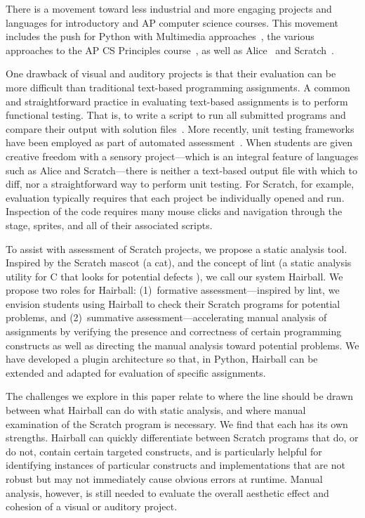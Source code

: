 There is a movement toward less industrial and more engaging projects and
languages for introductory and AP computer science courses.  This movement
includes the push for Python with Multimedia
approaches~\cite{Adams:2012:SLP:2157136.2157319, Forte:2004:CCC:962752.962945,
Simon:2010:ERC:1822090.1822151}, the various approaches to the AP CS Principles
course~\cite{Snyder:2012:FFC:2189835.2189852}, as well as
Alice~\cite{Cooper:2003:TOI:611892.611966} and
Scratch~\cite{Maloney:2010:SPL:1868358.1868363}.

One drawback of visual and auditory projects is that their evaluation can be
more difficult than traditional text-based programming assignments.  A common
and straightforward practice in evaluating text-based assignments is to perform
functional testing. That is, to write a script to run all submitted programs
and compare their output with solution
files~\cite{Jackson:1997:GSP:268084.268210}.  More recently, unit testing
frameworks have been employed as part of automated
assessment~\cite{Spacco:2006:EMD:1140124.1140131,
  Edwards:2003:RCS:949344.949390}.  When students are given creative freedom
with a sensory project---which is an integral feature of languages such as
Alice and Scratch---there is neither a text-based output file with which to
diff, nor a straightforward way to perform unit testing.  For Scratch, for
example, evaluation typically requires that each project be individually opened
and run.  Inspection of the code requires many mouse clicks and navigation
through the stage, sprites, and all of their associated scripts.

To assist with assessment of Scratch projects, we propose a static analysis
tool.  Inspired by the Scratch mascot (a cat), and the concept of lint (a
static analysis utility for C that looks for potential
defects \cite{Johnson78lint}), we call our system Hairball.  We propose two
roles for Hairball: (1)~formative assessment---inspired by lint, we envision
students using Hairball to check their Scratch programs for potential problems,
and (2)~summative assessment---accelerating manual analysis of assignments by
verifying the presence and correctness of certain programming constructs as
well as directing the manual analysis toward potential problems.  We have
developed a plugin architecture so that, in Python, Hairball can be extended
and adapted for evaluation of specific assignments.

The challenges we explore in this paper relate to where the line
should be drawn between what Hairball can do with static analysis, and
where manual examination of the Scratch program is necessary.  We find
that each has its own strengths.  Hairball can quickly differentiate
between Scratch programs that do, or do not, contain certain targeted
constructs, and is particularly helpful for identifying instances of
particular constructs and implementations that are not robust but may
not immediately cause obvious errors at runtime.  Manual analysis,
however, is still needed to evaluate the overall aesthetic effect and
cohesion of a visual or auditory project.

